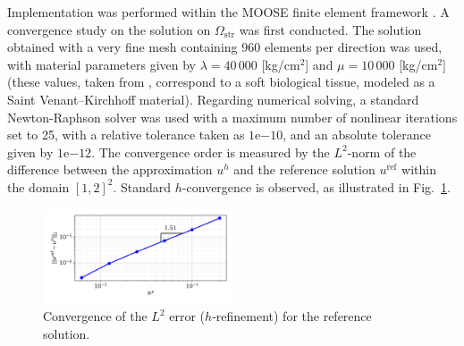 Implementation was performed within the MOOSE finite element framework \cite{permann2020moose}. A convergence study on the solution on $\Omega_\text{str}$ was first conducted. The solution obtained with a very fine mesh containing 960 elements per direction was used, with material parameters given by $\lambda = 40\,000$ [kg/cm$^2$] and $\mu = 10\,000$ [kg/cm$^2$] (these values, taken from \cite{picinbono2003non}, correspond to a soft biological tissue, modeled as a Saint Venant–Kirchhoff material). Regarding numerical solving, a standard Newton-Raphson solver was used with a maximum number of nonlinear iterations set to 25, with a relative tolerance taken as $1\mathrm{e}{-10}$, and an absolute tolerance given by $1\mathrm{e}{-12}$. The convergence order is measured by the $L^2$-norm of the difference between the approximation $u^h$ and the reference solution $u^{\text{ref}}$ within the domain $[1, 2]^2$. Standard $h$-convergence is observed, as illustrated in Fig.~\ref{fig:convergence}.
\begin{figure}[!htb]
    \begin{center}
        \includegraphics[width = 0.5\textwidth]{Pictures/convergence.png}
    \end{center}
    \caption[Convergence of the $L^2$ error ($h$-refinement) for the reference solution.]{Convergence of the $L^2$ error ($h$-refinement) for the reference solution.}
    \label{fig:convergence}
\end{figure}

